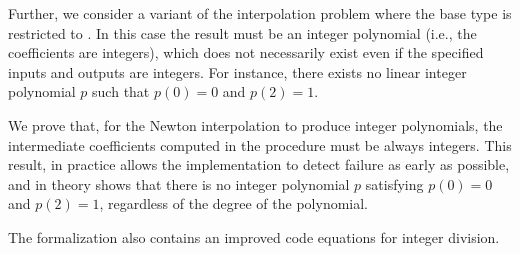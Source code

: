 \documentclass[11pt,a4paper]{article}
\begin{document}
Further, we consider a variant of the interpolation problem where the base type is restricted to .
In this case the result must be an integer polynomial (i.e., the coefficients are integers),
which does not necessarily exist even if the specified inputs and outputs are integers.
For instance, there exists no linear integer polynomial $p$ such that $p(0) = 0$ and $p(2) = 1$.

We prove that, for the Newton interpolation to produce integer polynomials, the intermediate coefficients computed in the procedure must be always integers.
This result, in practice allows the implementation to detect failure as early as possible,
and in theory shows that there is no integer polynomial $p$ satisfying $p(0) = 0$ and $p(2) = 1$,
regardless of the degree of the polynomial.

The formalization also contains an improved code equations for integer division.








\end{document}
